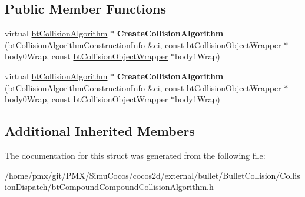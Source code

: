 \subsection*{Public Member Functions}
\begin{DoxyCompactItemize}
\item 
\mbox{\label{structbtCompoundCompoundCollisionAlgorithm_1_1CreateFunc_a8724054795b9fbc789fea71981e578fe}} 
virtual \hyperlink{classbtCollisionAlgorithm}{bt\+Collision\+Algorithm} $\ast$ {\bfseries Create\+Collision\+Algorithm} (\hyperlink{structbtCollisionAlgorithmConstructionInfo}{bt\+Collision\+Algorithm\+Construction\+Info} \&ci, const \hyperlink{structbtCollisionObjectWrapper}{bt\+Collision\+Object\+Wrapper} $\ast$body0\+Wrap, const \hyperlink{structbtCollisionObjectWrapper}{bt\+Collision\+Object\+Wrapper} $\ast$body1\+Wrap)
\item 
\mbox{\label{structbtCompoundCompoundCollisionAlgorithm_1_1CreateFunc_a8724054795b9fbc789fea71981e578fe}} 
virtual \hyperlink{classbtCollisionAlgorithm}{bt\+Collision\+Algorithm} $\ast$ {\bfseries Create\+Collision\+Algorithm} (\hyperlink{structbtCollisionAlgorithmConstructionInfo}{bt\+Collision\+Algorithm\+Construction\+Info} \&ci, const \hyperlink{structbtCollisionObjectWrapper}{bt\+Collision\+Object\+Wrapper} $\ast$body0\+Wrap, const \hyperlink{structbtCollisionObjectWrapper}{bt\+Collision\+Object\+Wrapper} $\ast$body1\+Wrap)
\end{DoxyCompactItemize}
\subsection*{Additional Inherited Members}


The documentation for this struct was generated from the following file\+:\begin{DoxyCompactItemize}
\item 
/home/pmx/git/\+P\+M\+X/\+Simu\+Cocos/cocos2d/external/bullet/\+Bullet\+Collision/\+Collision\+Dispatch/bt\+Compound\+Compound\+Collision\+Algorithm.\+h\end{DoxyCompactItemize}
